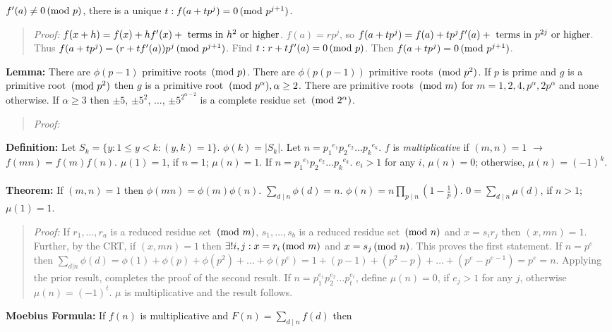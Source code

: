 $f'(a) \ne 0 \thinspace \textnormal{(mod } p \textnormal{)}$, there is a unique $t: f(a+tp^j)= 0 \thinspace \textnormal{(mod } p^{j+1} \textnormal{)}$.
\begin{quote}
\emph{Proof:} 
$f(x+h)= f(x)+ h f'(x)+ \textnormal{ terms in } h^2 \textnormal{ or higher}$.  $f(a)= rp^j$, so
$f(a+tp^j)= f(a)+ tp^j f'(a) + \textnormal{ terms in } p^{2j} \textnormal{ or higher}$.  Thus
$f(a+t p^j)= (r+t f'(a)) p^j \thinspace \textnormal{(mod } p^{j+1} \textnormal{)}$.   Find $t: r+t f'(a) = 0 \thinspace \textnormal{(mod } p \textnormal{)}$.  Then
$f(a+tp^j)= 0 \thinspace \textnormal{(mod } p^{j+1} \textnormal{)}$.
\end{quote}
{\bf Lemma:}  There are $\phi(p-1)$ primitive roots $\thinspace \textnormal{(mod } p \textnormal{)}$.  There are $\phi(p(p-1))$ primitive roots $\thinspace \textnormal{(mod } p^2 \textnormal{)}$.
If $p$ is prime and $g$ is a primitive root $\thinspace \textnormal{(mod } p^2 \textnormal{)}$ then $g$ is a primitive root $\thinspace \textnormal{(mod } p^{\alpha} \textnormal{)}, \alpha \ge 2$.
There are primitive roots $\thinspace \textnormal{(mod } m \textnormal{)}$ for $m = 1, 2, 4, p^{\alpha}, 2 p^{\alpha}$ and none otherwise. If
$\alpha \ge 3$ then $\pm 5$, $\pm 5^2$, ..., $\pm 5^{2^{\alpha - 2}}$ is a complete residue set $\thinspace \textnormal{(mod } 2^{\alpha} \textnormal{)}$.
\begin{quote}
\emph{Proof:} 
\end{quote}
{\bf Definition:} Let $S_k = \{y: 1 \leq y <k: (y,k)=1 \}$.  $\phi(k)= |S_k|$.
Let $n= {p_1}^{e_1} {p_2}^{e_2} \ldots {p_k}^{e_k}$. $f$ is \emph{multiplicative}
if $(m,n)=1$ $\rightarrow$ $f(mn)=f(m)f(n)$.
$\mu(1)= 1$, if $n=1$; $\mu(n)=1$.  If 
$n= {p_1}^{e_1} {p_2}^{e_2} \ldots {p_k}^{e_k}$.
$e_i > 1$ for any $i$, $\mu(n)=0$; otherwise, $\mu(n)= (-1)^k$.
\\
\\
{\bf Theorem:} 
If $(m,n)=1$ then $\phi(mn)= \phi(m) \phi(n)$.
$ \sum_{d \mid n} \phi(d)= n$.
$ \phi(n)=  n \prod_{p \mid n} (1- {\frac {1} {p}})$.
$ 0=  \sum_{d \mid n} \mu(d)$, if $n>1$; $\mu(1)=1$.
\begin{quote}
\emph{Proof:}
If $r_1, \ldots, r_a$ is a reduced residue set $\thinspace \textnormal{(mod } m \textnormal{)}$,
$s_1, \ldots , s_b$ is a reduced residue set $\thinspace \textnormal{(mod } n \textnormal{)}$ and
$x= s_i r_j$ then $(x,mn)=1$.  Further, by the CRT, if
$(x, mn)=1$ then $\exists ! i, j: x= r_i \thinspace \textnormal{(mod } m \textnormal{)}$ and $x= s_j \thinspace \textnormal{(mod } n \textnormal{)}$.  This proves
the first statement.  If $n= p^e$ then
$\sum_{d|n} \phi(d)= \phi(1) + \phi(p) + \phi(p^2) + \ldots + \phi(p^e)=
1 + (p-1) + (p^2-p) + \ldots + (p^e - p^{e-1})= p^e = n$.  Applying the prior result,
completes the proof of the second result.  If $n= p_1^{e_1} p_2^{e_2} \ldots p_t^{e_t}$,
define $\mu(n)=0$, if $e_j > 1$ for any $j$, otherwise $\mu(n)= (-1)^t$.  $\mu$ is
multiplicative and the result follows.
\end{quote}
{\bf Moebius Formula:} If $f(n)$ is multiplicative and 
$F(n)=  \sum_{d \mid n} f(d)$ then
